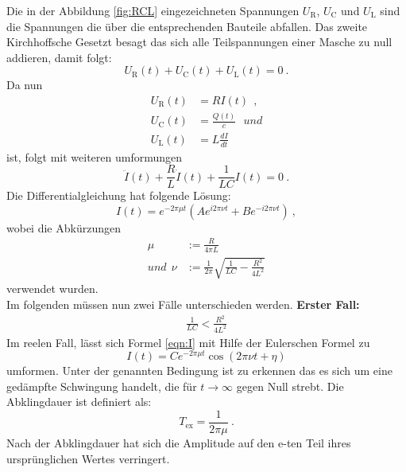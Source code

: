 Die in der Abbildung \ref{fig:RCL} eingezeichneten Spannungen $U_\text{R}$, $U_\text{C}$ und $U_\text{L}$ sind die Spannungen die über die entsprechenden Bauteile abfallen. Das zweite Kirchhoffsche Gesetzt besagt das sich alle Teilspannungen einer Masche zu null addieren, damit folgt:
\begin{equation}
	U_\text{R}(t) + U_\text{C}(t) + U_\text{L}(t) = 0 \ .
\end{equation}
Da nun
\begin{align*}
	U_\text{R}(t) &= R I(t) \ \ , \\
	U_\text{C}(t) &= \frac{Q(t)}{c} \ \ \ und \\
	U_\text{L}(t) &= L \frac{d I}{d t}
\end{align*}
ist, folgt mit weiteren umformungen
\begin{equation}
	\ddot{I}(t) + \frac{R}{L} \dot{I}(t) + \frac{1}{LC} I(t) = 0 \ .
\end{equation}
Die Differentialgleichung hat folgende Lösung:
\begin{equation}
	I(t) = e^{-2 \pi \mu t} \left(A e^{i2 \pi \nu t} + B e^{-i2 \pi \nu t} \right) \ ,
	\label{eqn:I}
\end{equation}
wobei die Abkürzungen
\begin{align}
	\mu & := \frac{R}{4 \pi L} \\
	\label{eqn:mu}
	und \ \ \nu & := \frac{1}{2 \pi} \sqrt{\frac{1}{LC} - \frac{R^2}{4L^2}}
\end{align}
verwendet wurden. \\
Im folgenden müssen nun zwei Fälle unterschieden werden.
\newline
\newline
\textbf{Erster Fall:}
\begin{align*}
	\frac{1}{LC} < \frac{R^2}{4L^2}
\end{align*}
Im reelen Fall, lässt sich Formel \ref{eqn:I} mit Hilfe der Eulerschen Formel zu
\begin{equation}
	I(t) = C e^{-2 \pi \mu t} \cos(2 \pi \nu t + \eta)
\end{equation}
umformen. Unter der genannten Bedingung ist zu erkennen das es sich um eine gedämpfte Schwingung handelt, die für $t \to \infty$ gegen Null strebt. Die Abklingdauer ist definiert als:
\begin{equation}
	T_\text{ex} = \frac{1}{2 \pi \mu} \ .
	\label{eqn:tex}
\end{equation}
Nach der Abklingdauer hat sich die Amplitude auf den e-ten Teil ihres ursprünglichen Wertes verringert.
